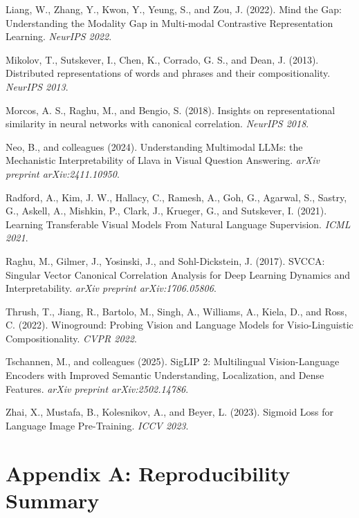 \documentclass[11pt,a4paper]{article}
\begin{document}
Liang, W., Zhang, Y., Kwon, Y., Yeung, S., and Zou, J. (2022). Mind the
Gap: Understanding the Modality Gap in Multi-modal Contrastive
Representation Learning. \emph{NeurIPS 2022}.

Mikolov, T., Sutskever, I., Chen, K., Corrado, G. S., and Dean, J.
(2013). Distributed representations of words and phrases and their
compositionality. \emph{NeurIPS 2013}.

Morcos, A. S., Raghu, M., and Bengio, S. (2018). Insights on
representational similarity in neural networks with canonical
correlation. \emph{NeurIPS 2018}.

Neo, B., and colleagues (2024). Understanding Multimodal LLMs: the
Mechanistic Interpretability of Llava in Visual Question Answering.
\emph{arXiv preprint arXiv:2411.10950}.

Radford, A., Kim, J. W., Hallacy, C., Ramesh, A., Goh, G., Agarwal, S.,
Sastry, G., Askell, A., Mishkin, P., Clark, J., Krueger, G., and
Sutskever, I. (2021). Learning Transferable Visual Models From Natural
Language Supervision. \emph{ICML 2021}.

Raghu, M., Gilmer, J., Yosinski, J., and Sohl-Dickstein, J. (2017).
SVCCA: Singular Vector Canonical Correlation Analysis for Deep Learning
Dynamics and Interpretability. \emph{arXiv preprint arXiv:1706.05806}.

Thrush, T., Jiang, R., Bartolo, M., Singh, A., Williams, A., Kiela, D.,
and Ross, C. (2022). Winoground: Probing Vision and Language Models for
Visio-Linguistic Compositionality. \emph{CVPR 2022}.

Tschannen, M., and colleagues (2025). SigLIP 2: Multilingual
Vision-Language Encoders with Improved Semantic Understanding,
Localization, and Dense Features. \emph{arXiv preprint
arXiv:2502.14786}.

Zhai, X., Mustafa, B., Kolesnikov, A., and Beyer, L. (2023). Sigmoid
Loss for Language Image Pre-Training. \emph{ICCV 2023}.

\section{Appendix A: Reproducibility
Summary}\label{appendix-a-reproducibility-summary}
\end{document}
